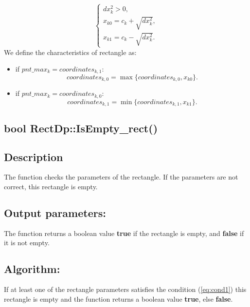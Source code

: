 \documentclass{report}
\begin{document}
\begin{itemize}
\begin{itemize}
			\begin{equation}
				\begin{cases}
					dx_k^2 > 0,\\ 
					x_{k0} = c_k + \sqrt {dx_k^2},\\
					x_{k1} = c_k - \sqrt {dx_k^2}.
				\label{eq:l1l2}
				\end{cases}
			\end{equation}
			We define the characteristics of rectangle as:
			
			\begin{itemize}
				\item if $pnt\_max_k = coordinates_{k,1}$:	
				\begin{equation}
					coordinates_{k,0} = \max\{coordinates_{k,0}, x_{k0}\}. 
					\label{eq:cond1}
				\end{equation}
			
				\item if $pnt\_max_k = coordinates_{k,0}$:	
				\begin{equation}
					coordinates_{k,1} = \min\{coordinates_{k,1}, x_{k1}\}. 
					\label{eq:cond2}
				\end{equation}	
			\end{itemize}
		\end{itemize}
	\end{itemize}


	\label{Empty}
\begin{center} 
	\section*{\bfseries bool RectDp::IsEmpty\_rect()}
\end{center} 

\subsection*{Description}

The function checks the parameters of the rectangle. If the parameters are not correct, this rectangle is empty. 

\subsection*{Output parameters:}

The function returns a boolean value {\bfseries true} if the rectangle is empty, and {\bfseries false} if it is not empty.

\subsection*{Algorithm:}

If at least one of the rectangle parameters satisfies the condition  (\ref{eq:cond1}) this rectangle is empty and the function returns a boolean value {\bfseries true}, else  {\bfseries false}.
\end{document}
